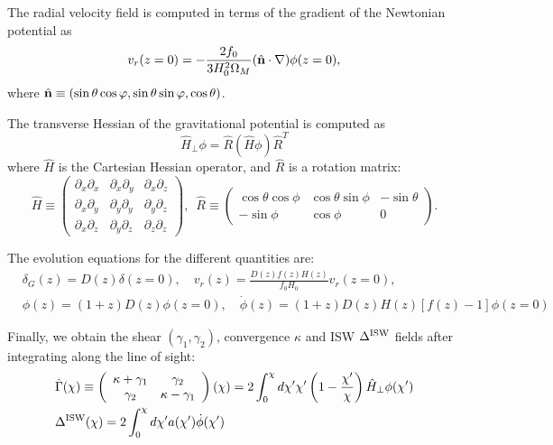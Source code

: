 \documentclass[a4paper,10pt]{article}
\newcommand{\nv}{\hat{\bf n}}
\begin{document}
  The radial velocity field is computed in terms of the gradient of the Newtonian
  potential as
  \begin{equation}
    v_r(z=0)=-\frac{2f_0}{3H_0^2\Omega_M}(\nv\cdot\nabla)\phi(z=0),
  \end{equation}
  where $\nv\equiv(\sin\theta\cos\varphi,\sin\theta\sin\varphi,\cos\theta)$.

  The transverse Hessian of the gravitational potential is computed as
  \begin{equation}
    \hat{H}_\perp\phi=\hat{R}(\hat{H}\phi)\hat{R}^T
  \end{equation}
  where $\hat{H}$ is the Cartesian Hessian operator, and $\hat{R}$ is a rotation
  matrix:
  \begin{equation}
    \hat{H}\equiv\left(
    \begin{array}{ccc}
      \partial_x\partial_x & \partial_x\partial_y & \partial_x\partial_z\\
      \partial_x\partial_y & \partial_y\partial_y & \partial_y\partial_z\\
      \partial_x\partial_z & \partial_y\partial_z & \partial_z\partial_z
    \end{array}\right),
    \hspace{6pt}
    \hat{R}\equiv\left(
    \begin{array}{ccc}
      \cos\theta\cos\phi & \cos\theta\sin\phi & -\sin\theta\\
      -\sin\phi & \cos\phi & 0
    \end{array}
    \right).
  \end{equation}

  The evolution equations for the different quantities are:
  \begin{align}
    &\delta_G(z)=D(z)\delta(z=0),\hspace{12pt}
    v_r(z)=\frac{D(z)f(z)H(z)}{f_0H_0}v_r(z=0),\\
    &\phi(z)=(1+z)D(z)\phi(z=0),\hspace{12pt}
    \dot{\phi}(z)=(1+z)D(z)H(z)[f(z)-1]\phi(z=0)
  \end{align}

  Finally, we obtain the shear $(\gamma_1,\gamma_2)$, convergence $\kappa$
  and ISW $\Delta^{\rm ISW}$ fields after integrating along the line
  of sight:
  \begin{align}
    &\hat{\Gamma}(\chi)\equiv\left(
    \begin{array}{cc}
      \kappa+\gamma_1 & \gamma_2\\
      \gamma_2 & \kappa-\gamma_1
    \end{array}\right)(\chi)=
    2\int_0^\chi d\chi'\chi'\left(1-\frac{\chi'}{\chi}\right)\hat{H}_\perp\phi(\chi')\\
    &\Delta^{\rm ISW}(\chi)=2\int_0^\chi d\chi'a(\chi')\dot{\phi}(\chi')
  \end{align}
  
\end{document}
